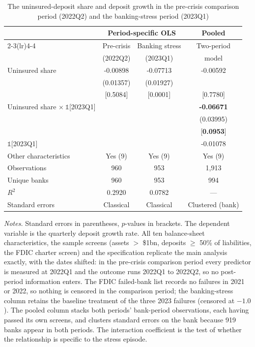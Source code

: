 \begin{table}[htbp]
\centering
\caption{The uninsured-deposit share and deposit growth in the pre-crisis comparison period (2022Q2) and the banking-stress period (2023Q1)}
\label{tab:placebo_precrisis}
\begin{tabular}{lccc}
\toprule
 & \multicolumn{2}{c}{Period-specific OLS} & Pooled \\
\cmidrule(lr){2-3}\cmidrule(lr){4-4}
 & Pre-crisis & Banking stress & Two-period \\
 & (2022Q2) & (2023Q1) & model \\
\midrule
Uninsured share & -0.00898 & -0.07713 & -0.00592 \\
 & (0.01357) & (0.01927) & \\
 & [0.5084] & [0.0001] & [0.7780] \\
\addlinespace
Uninsured share $\times\ \mathbb{1}$[2023Q1] & & & \textbf{-0.06671} \\
 & & & (0.03995) \\
 & & & [\textbf{0.0953}] \\
\addlinespace
$\mathbb{1}$[2023Q1] & & & -0.01078 \\
\midrule
Other characteristics & Yes (9) & Yes (9) & Yes (9) \\
Observations & 960 & 953 & 1,913 \\
Unique banks & 960 & 953 & 994 \\
$R^2$ & 0.2920 & 0.0782 & --- \\
Standard errors & Classical & Classical & Clustered (bank) \\
\bottomrule
\end{tabular}
\begin{minipage}{0.95\textwidth}
\vspace{2mm}\footnotesize
\textit{Notes.} Standard errors in parentheses, $p$-values in brackets. The dependent variable is the quarterly deposit growth rate. All ten balance-sheet characteristics, the sample screens (assets $>$ \$1bn, deposits $\geq$ 50\% of liabilities, the FDIC charter screen) and the specification replicate the main analysis exactly, with the dates shifted: in the pre-crisis comparison period every predictor is measured at 2022Q1 and the outcome runs 2022Q1 to 2022Q2, so no post-period information enters. The FDIC failed-bank list records no failures in 2021 or 2022, so nothing is censored in the comparison period; the banking-stress column retains the baseline treatment of the three 2023 failures (censored at $-1.0$). The pooled column stacks both periods' bank-period observations, each having passed its own screens, and clusters standard errors on the bank because 919 banks appear in both periods. The interaction coefficient is the test of whether the relationship is specific to the stress episode.
\end{minipage}
\end{table}
